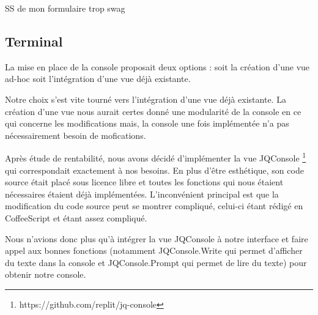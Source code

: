 SS de mon formulaire trop swag

\subsection{Terminal}

\par La mise en place de la console proposait deux options : soit la création d'une vue ad-hoc soit l'intégration d'une vue déjà existante.

\par Notre choix s'est vite tourné vers l'intégration d'une vue déjà existante. La création d'une vue nous aurait certes donné une modularité de la console en ce qui concerne les modifications mais, la console une fois implémentée n'a pas nécessairement besoin de mofications.

\par Après étude de rentabilité, nous avons décidé d'implémenter la vue JQConsole \footnote{https://github.com/replit/jq-console} qui correspondait exactement à nos besoins. En plus d'être esthétique, son code source était placé sous licence libre et toutes les fonctions qui nous étaient nécessaires étaient déjà implémentées. L'inconvénient principal est que la modification du code source peut se montrer compliqué, celui-ci étant rédigé en CoffeeScript et étant assez compliqué.

\par Nous n'avions donc plus qu'à intégrer la vue JQConsole à notre interface et faire appel aux bonnes fonctions (notamment JQConsole.Write qui permet d'afficher du texte dans la console et JQConsole.Prompt qui permet de lire du texte) pour obtenir notre console.
